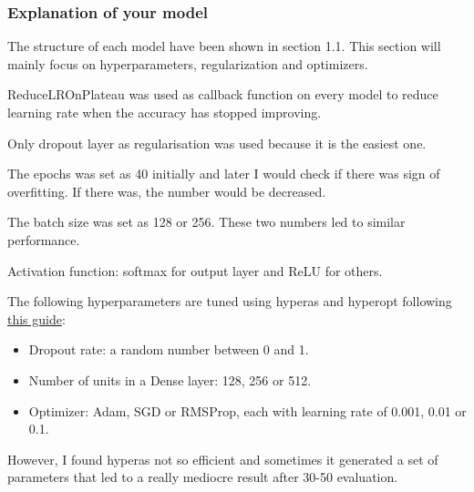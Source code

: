 \documentclass[12pt]{article}
\begin{document}
\subsubsection{Explanation of your model}

The structure of each model have been shown in section 1.1. This section will mainly focus on hyperparameters, regularization and optimizers.

ReduceLROnPlateau was used as callback function on every model to reduce learning rate when the accuracy has stopped improving.

Only dropout layer as regularisation was used because it is the easiest one.

The epochs was set as 40 initially and later I would check if there was sign of overfitting. If there was, the number would be decreased.

The batch size was set as 128 or 256. These two numbers led to similar performance.

Activation function: softmax for output layer and ReLU for others.

The following hyperparameters are tuned using hyperas and hyperopt following \href{https://towardsdatascience.com/a-guide-to-an-efficient-way-to-build-neural-network-architectures-part-ii-hyper-parameter-42efca01e5d7}{this guide}:
\begin{itemize}
  \item Dropout rate: a random number between 0 and 1.
  \item Number of units in a Dense layer: 128, 256 or 512.
  \item Optimizer: Adam, SGD or RMSProp, each with learning rate of 0.001, 0.01 or 0.1.
\end{itemize}

However, I found hyperas not so efficient and sometimes it generated a set of parameters that led to a really mediocre result after 30-50 evaluation.
\end{document}
